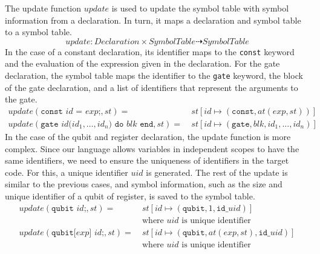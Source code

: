 The update function $update$ is used to update the symbol table with symbol information from a declaration. In turn, it maps a declaration and symbol table to a symbol table.
\begin{equation*}
    update :  Declaration \times SymbolTable \dashrightarrow SymbolTable
\end{equation*}
In the case of a constant declaration, its identifier maps to the \texttt{const} keyword and the evaluation of the expression given in the declaration. For the gate declaration, the symbol table maps the identifier to the \texttt{gate} keyword, the block of the gate declaration, and a list of identifiers that represent the arguments to the gate.  
\begin{align*}
    update(\texttt{const } id \texttt{ = } exp \texttt{;}, st) = \ & st[id \mapsto (\texttt{const}, at(exp, st))]\\
    update(\texttt{gate } id \texttt{(}id_1, \dots, id_n\texttt{)} \texttt{ do } blk \texttt{ end}, st) = \ & st[id \mapsto (\texttt{gate}, blk, id_1, \dots, id_n)]
\end{align*}
In the case of the qubit and register declaration, the update function is more complex. Since our language allows variables in independent scopes to have the same identifiers, we need to ensure the uniqueness of identifiers in the target code. For this, a unique identifier $uid$ is generated. The rest of the update is similar to the previous cases, and symbol information, such as the size and unique identifier of a qubit of register, is saved to the symbol table.   
\begin{align*}
    update(\texttt{qubit } id\texttt{;}, st) = \ & st[id \mapsto (\texttt{qubit}, 1, \texttt{id\_}uid)]\\
                                                 & \text{where } uid \text{ is unique identifier}\\
    update(\texttt{qubit[} exp \texttt{] } id\texttt{;}, st) = \ & st[id \mapsto (\texttt{qubit}, at(exp, st), \texttt{id\_}uid)]\\
                                                 & \text{where } uid \text{ is unique identifier}
\end{align*}

